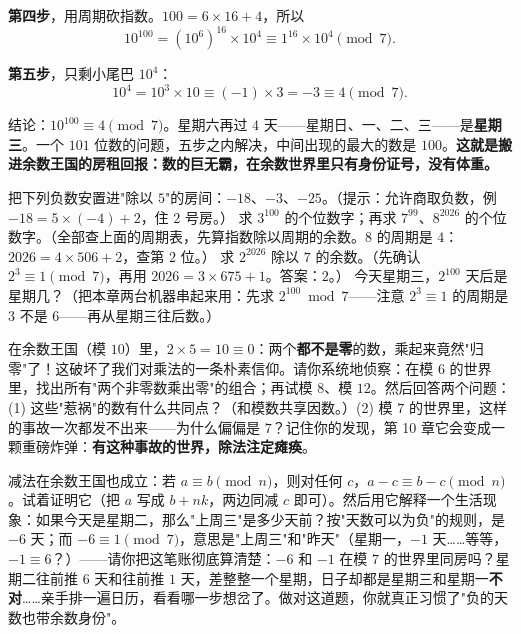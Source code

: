 \textbf{第四步}，用周期砍指数。$100 = 6\times 16 + 4$，所以
\[
10^{100} = \left(10^{6}\right)^{16} \times 10^{4} \equiv 1^{16} \times 10^{4} \pmod 7 .
\]

\textbf{第五步}，只剩小尾巴 $10^4$：
\[
10^4 = 10^3 \times 10 \equiv (-1)\times 3 = -3 \equiv 4 \pmod 7 .
\]

结论：$10^{100} \equiv 4 \pmod 7$。星期六再过 $4$ 天——星期日、一、二、三——是\textbf{星期三}。一个 $101$ 位数的问题，五步之内解决，中间出现的最大的数是 $100$。\textbf{这就是搬进余数王国的房租回报：数的巨无霸，在余数世界里只有身份证号，没有体重。}

\begin{dongshou}
\begin{itemize}
  \yisi 把下列负数安置进"除以 $5$"的房间：$-18$、$-3$、$-25$。（提示：允许商取负数，例 $-18 = 5\times(-4) + 2$，住 $2$ 号房。）
  \yier 求 $3^{100}$ 的个位数字；再求 $7^{99}$、$8^{2026}$ 的个位数字。（全部查上面的周期表，先算指数除以周期的余数。$8$ 的周期是 $4$：$2026 = 4\times 506 + 2$，查第 $2$ 位。）
  \yier 求 $2^{2026}$ 除以 $7$ 的余数。（先确认 $2^3 \equiv 1 \pmod 7$，再用 $2026 = 3\times 675 + 1$。答案：$2$。）
  \yier 今天星期三，$2^{100}$ 天后是星期几？（把本章两台机器串起来用：先求 $2^{100} \bmod 7$——注意 $2^3 \equiv 1$ 的周期是 $3$ 不是 $6$——再从星期三往后数。）
\end{itemize}
\end{dongshou}

\begin{shaonao}
在余数王国（模 $10$）里，$2 \times 5 = 10 \equiv 0$：两个\textbf{都不是零}的数，乘起来竟然"归零"了！这破坏了我们对乘法的一条朴素信仰。请你系统地侦察：在模 $6$ 的世界里，找出所有"两个非零数乘出零"的组合；再试模 $8$、模 $12$。然后回答两个问题：(1) 这些"惹祸"的数有什么共同点？（和模数共享因数。）(2) 模 $7$ 的世界里，这样的事故一次都发不出来——为什么偏偏是 $7$？记住你的发现，第 10 章它会变成一颗重磅炸弹：\textbf{有这种事故的世界，除法注定瘫痪}。
\end{shaonao}

\begin{shaonao}
减法在余数王国也成立：若 $a\equiv b \pmod n$，则对任何 $c$，$a - c \equiv b - c \pmod n$。试着证明它（把 $a$ 写成 $b + nk$，两边同减 $c$ 即可）。然后用它解释一个生活现象：如果今天是星期二，那么"上周三"是多少天前？按"天数可以为负"的规则，是 $-6$ 天；而 $-6 \equiv 1 \pmod 7$，意思是"上周三"和"昨天"（星期一，$-1$ 天……等等，$-1 \equiv 6$？）——请你把这笔账彻底算清楚：$-6$ 和 $-1$ 在模 $7$ 的世界里同房吗？星期二往前推 $6$ 天和往前推 $1$ 天，差整整一个星期，日子却都是星期三和星期一\textbf{不对}……亲手排一遍日历，看看哪一步想岔了。做对这道题，你就真正习惯了"负的天数也带余数身份"。
\end{shaonao}


